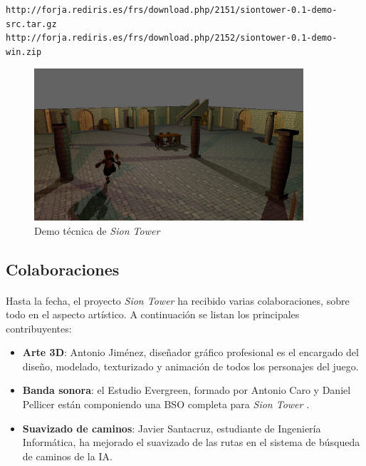 \documentclass[16pt,spanish]{article}
\def \juego{\emph {Sion Tower} }
\begin{document}
\begin{verbatim}
http://forja.rediris.es/frs/download.php/2151/siontower-0.1-demo-src.tar.gz
http://forja.rediris.es/frs/download.php/2152/siontower-0.1-demo-win.zip
\end{verbatim}

\begin{figure}[H]
    \centering
        \includegraphics[width=10cm]{img/siontower-demo.png} 
    \caption{Demo técnica de \juego}
    \label{img:siontower-demo}
\end{figure}

\subsection{Colaboraciones}

\paragraph{}
Hasta la fecha, el proyecto \juego ha recibido varias colaboraciones, sobre
todo en el aspecto artístico. A continuación se listan los principales
contribuyentes:

\begin{itemize}
    \item \textbf{Arte 3D}: Antonio Jiménez, diseñador gráfico profesional 
    es el encargado del diseño, modelado, texturizado y animación de todos los personajes
    del juego.
    \item \textbf{Banda sonora}: el Estudio Evergreen, formado por Antonio Caro y Daniel
    Pellicer están componiendo una BSO completa para \juego.
    \item \textbf{Suavizado de caminos}: Javier Santacruz, estudiante de
    Ingeniería Informática, ha mejorado el suavizado de las rutas en el
    sistema de búsqueda de caminos de la IA.
\end{itemize}
\end{document}
